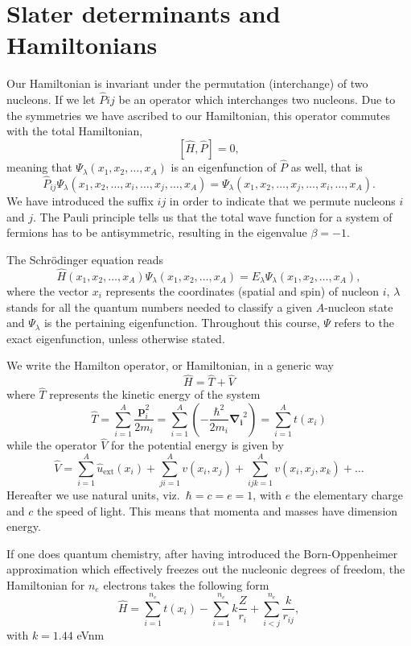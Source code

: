 \section{Slater determinants and Hamiltonians}
Our Hamiltonian is invariant under the permutation (interchange) of
two nucleons.  If we let $\hat{P}{ij}$ be an operator which
interchanges two nucleons.  Due to the symmetries we have ascribed to
our Hamiltonian, this operator commutes with the total Hamiltonian,
\[
[\hat{H},\hat{P}] = 0,
\]
meaning that $\Psi_{\lambda}(x_1, x_2, \dots , x_A)$ is an
eigenfunction of $\hat{P}$ as well, that is
\[
\hat{P}_{ij}\Psi_{\lambda}(x_1, x_2, \dots,x_i,\dots,x_j,\dots,x_A)=
\Psi_{\lambda}(x_1, x_2, \dots,x_j,\dots,x_i,\dots,x_A).
\]
We have introduced the
suffix $ij$ in order to indicate that we permute nucleons $i$ and $j$.
The Pauli principle tells us that the total wave function for a system
of fermions has to be antisymmetric, resulting in the eigenvalue
$\beta = -1$.

The Schr\"odinger equation reads
\begin{equation}
\hat{H}(x_1, x_2, \dots , x_A) \Psi_{\lambda}(x_1, x_2, \dots , x_A) =
E_\lambda \Psi_\lambda(x_1, x_2, \dots , x_A),
\label{eq:basicSE1}
\end{equation}
where the vector $x_i$ represents the coordinates (spatial and spin)
of nucleon $i$, $\lambda$ stands for all the quantum numbers needed to
classify a given $A$-nucleon state and $\Psi_{\lambda}$ is the
pertaining eigenfunction.  Throughout this course, $\Psi$ refers to
the exact eigenfunction, unless otherwise stated.

We write the Hamilton operator, or Hamiltonian, in a generic way
\[
	\hat{H} = \hat{T} + \hat{V}
\]
where $\hat{T}$ represents the kinetic energy of the system
\[
	\hat{T} = \sum_{i=1}^A \frac{\mathbf{p}_i^2}{2m_i} =
        \sum_{i=1}^A \left( -\frac{\hbar^2}{2m_i} \mathbf{\nabla_i}^2
        \right) = \sum_{i=1}^A t(x_i)
\]
while the operator $\hat{V}$ for the potential energy is given by
\begin{equation}
	\hat{V} = \sum_{i=1}^A \hat{u}_{\mathrm{ext}}(x_i) +
        \sum_{ji=1}^A v(x_i,x_j)+\sum_{ijk=1}^Av(x_i,x_j,x_k)+\dots
\label{eq:firstv}
\end{equation}
Hereafter we use natural units, viz.~$\hbar=c=e=1$, with $e$ the
elementary charge and $c$ the speed of light. This means that momenta
and masses have dimension energy.

If one does quantum chemistry, after having introduced the
Born-Oppenheimer approximation which effectively freezes out the
nucleonic degrees of freedom, the Hamiltonian for $n_e$ electrons
takes the following form
\[
  \hat{H} = \sum_{i=1}^{n_e} t(x_i) - \sum_{i=1}^{n_e} k\frac{Z}{r_i}
  + \sum_{i<j}^{n_e} \frac{k}{r_{ij}},
\]
with $k=1.44$ eVnm

